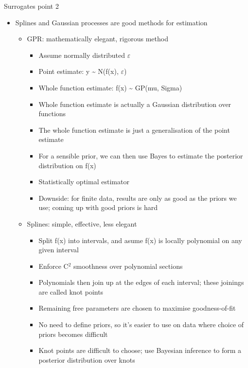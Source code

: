 \documentclass[presentation]{beamer}
\begin{document}
\begin{frame}[plain,label={sec:org4b2e45f}]{Surrogates point 2}
\begin{itemize}
\item Splines and Gaussian processes are good methods for estimation
\begin{itemize}
\item GPR: mathematically elegant, rigorous method
\begin{itemize}
\item Assume normally distributed \(\varepsilon\)
\item Point estimate: y \textasciitilde{} N(f(x), \(\varepsilon\))
\item Whole function estimate: f(x) \textasciitilde{} GP(mu, Sigma)
\item Whole function estimate is actually a Gaussian distribution over functions
\item The whole function estimate is just a generalisation of the point estimate
\item For a sensible prior, we can then use Bayes to estimate the posterior distribution on f(x)
\item Statistically optimal estimator
\item Downside: for finite data, results are only as good as the priors we use; coming up with good priors is hard
\end{itemize}

\item Splines: simple, effective, less elegant
\begin{itemize}
\item Split f(x) into intervals, and asume f(x) is locally polynomial on any given interval
\item Enforce C\(^{\text{2}}\) smoothness over polynomial sections
\item Polynomials then join up at the edges of each interval; these joinings are called knot points
\item Remaining free parameters are chosen to maximise goodness-of-fit
\item No need to define priors, so it's easier to use on data where choice of priors becomes difficult
\item Knot points are difficult to choose; use Bayesian inference to form a posterior distribution over knots
\end{itemize}
\end{itemize}
\end{itemize}
\end{frame}
\end{document}
